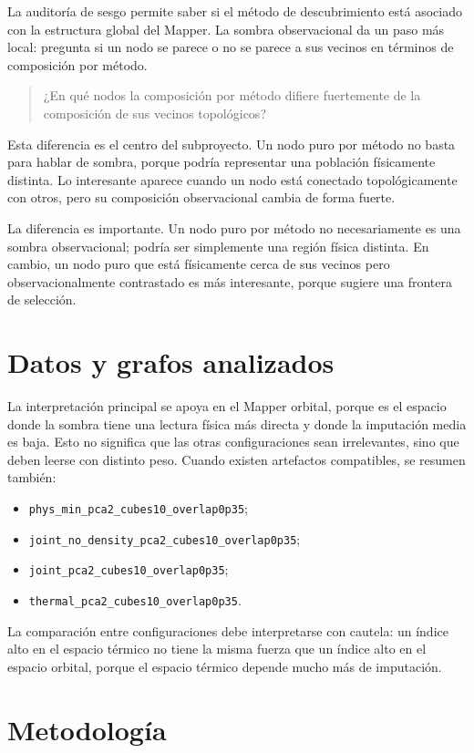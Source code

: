 \documentclass[11pt]{article}
\begin{document}
La auditoría de sesgo permite saber si el método de descubrimiento está asociado con la estructura global del Mapper. La sombra observacional da un paso más local: pregunta si un nodo se parece o no se parece a sus vecinos en términos de composición por método.
\begin{quote}
¿En qué nodos la composición por método difiere fuertemente de la composición de sus vecinos topológicos?
\end{quote}

Esta diferencia es el centro del subproyecto. Un nodo puro por método no basta para hablar de sombra, porque podría representar una población físicamente distinta. Lo interesante aparece cuando un nodo está conectado topológicamente con otros, pero su composición observacional cambia de forma fuerte.

La diferencia es importante. Un nodo puro por método no necesariamente es una sombra observacional; podría ser simplemente una región física distinta. En cambio, un nodo puro que está físicamente cerca de sus vecinos pero observacionalmente contrastado es más interesante, porque sugiere una frontera de selección.

\section{Datos y grafos analizados}

La interpretación principal se apoya en el Mapper orbital, porque es el espacio donde la sombra tiene una lectura física más directa y donde la imputación media es baja. Esto no significa que las otras configuraciones sean irrelevantes, sino que deben leerse con distinto peso. Cuando existen artefactos compatibles, se resumen también:
\begin{itemize}
  \item \texttt{phys\_min\_pca2\_cubes10\_overlap0p35};
  \item \texttt{joint\_no\_density\_pca2\_cubes10\_overlap0p35};
  \item \texttt{joint\_pca2\_cubes10\_overlap0p35};
  \item \texttt{thermal\_pca2\_cubes10\_overlap0p35}.
\end{itemize}

La comparación entre configuraciones debe interpretarse con cautela: un índice alto en el espacio térmico no tiene la misma fuerza que un índice alto en el espacio orbital, porque el espacio térmico depende mucho más de imputación.

\section{Metodología}
\end{document}
